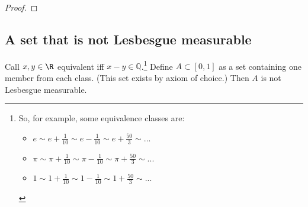 \documentclass{article} %
\begin{document}
\begin{proof}
\end{proof}

\subsection{A set that is not Lesbesgue measurable} \label{sec:set_that_is_not_lesbesgue_measurable}

\begin{proposition}
Call $x,y \in \R$ equivalent iff $x-y \in \mathbb{Q}$.\footnote{So, for example, some equivalence classes are:
\begin{itemize}
\item $e \sim e + \frac{1}{10} \sim e - \frac{1}{10} \sim e+\frac{50}{3} \sim ...$
\item  $\pi \sim \pi + \frac{1}{10} \sim \pi - \frac{1}{10} \sim \pi+\frac{50}{3} \sim ...$
\item $1 \sim 1 + \frac{1}{10} \sim 1 - \frac{1}{10} \sim 1 +\frac{50}{3} \sim ...$
\end{itemize}
} Define $A \subset [0,1]$ as a set containing one member from each class. (This set exists by axiom of choice.) Then $A$ is not Lesbesgue measurable.

\label{prop:existence_of_set_that_is_not_lesbesgue_measurable}
\end{proposition}
\end{document}
